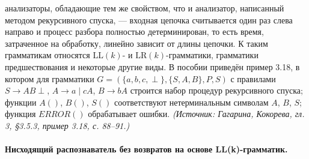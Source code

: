 \documentclass[a4paper,12pt]{article}
\begin{document}
анализаторы, обладающие тем же свойством, что и анализатор, написанный методом рекурсивного спуска, — входная цепочка считывается один раз слева направо и процесс разбора полностью детерминирован, то есть время, затраченное на обработку, линейно зависит от длины цепочки. К таким грамматикам относятся \(\mathrm{LL}(k)\)- и \(\mathrm{LR}(k)\)-грамматики, грамматики предшествования и некоторые другие виды. В пособии приведён пример 3.18, в котором для грамматики \(G=(\{a,b,c,\perp\},\{S,A,B\},P,S)\) с правилами \(S\to AB\perp\), \(A\to a\mid cA\), \(B\to bA\) строится набор процедур рекурсивного спуска; функции \(A()\), \(B()\), \(S()\) соответствуют нетерминальным символам \(A\), \(B\), \(S\); функция \(ERROR()\) обрабатывает ошибки.
\textit{(Источник: Гагарина, Кокорева, гл. 3, §3.5.3, пример 3.18, с. 88--91.)}

\paragraph{Нисходящий распознаватель без возвратов на основе LL(k)-грамматик.}
\end{document}
